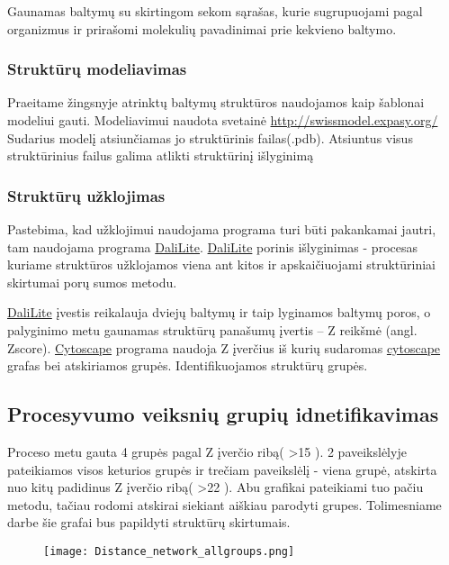 \documentclass[a4paper,12pt]{article}
\begin{document}
Gaunamas baltymų su skirtingom sekom sąrašas, kurie sugrupuojami pagal organizmus ir prirašomi molekulių pavadinimai prie kekvieno baltymo.

\subsubsection{Struktūrų modeliavimas}

\qquad Praeitame žingsnyje atrinktų baltymų struktūros naudojamos kaip šablonai modeliui gauti. Modeliavimui naudota svetainė \hyperlink{swissprot}{http://swissmodel.expasy.org/}
Sudarius modelį atsiunčiamas jo struktūrinis failas(.pdb). Atsiuntus visus struktūrinius failus galima atlikti struktūrinį išlyginimą

\subsubsection{Struktūrų užklojimas}
\qquad Pastebima, kad užklojimui naudojama programa turi būti pakankamai jautri, tam naudojama programa \hyperlink{DaliLite}{DaliLite}. \hyperlink{DaliLite}{DaliLite} porinis išlyginimas - procesas kuriame struktūros užklojamos viena ant kitos ir apskaičiuojami struktūriniai skirtumai porų sumos metodu. 

\qquad \hyperlink{DaliLite}{DaliLite} įvestis reikalauja dviejų baltymų ir taip lyginamos baltymų poros, o palyginimo metu gaunamas struktūrų panašumų įvertis – Z reikšmė (angl. Zscore). \hyperlink{Cytoscape}{Cytoscape} programa naudoja Z įverčius iš kurių sudaromas \hyperlink{Cytoscape}{cytoscape} grafas bei atskiriamos grupės. Identifikuojamos struktūrų grupės.

\subsection{Procesyvumo veiksnių grupių idnetifikavimas}

\qquad Proceso metu gauta 4 grupės pagal Z įverčio ribą( >15 ). 2 paveikslėlyje pateikiamos visos keturios grupės ir trečiam paveikslėlį - viena grupė, atskirta nuo kitų padidinus Z įverčio ribą( >22 ). Abu grafikai pateikiami tuo pačiu metodu, tačiau rodomi atskirai siekiant aiškiau parodyti grupes. Tolimesniame darbe šie grafai bus papildyti struktūrų skirtumais. 
\clearpage




\begin{figure}[!tph]
	\centering
	\hspace*{-2.5cm}
    \texttt{[image: Distance\_network\_allgroups.png]}
    \label{fig:verticalcell}
\end{figure}
\end{document}
